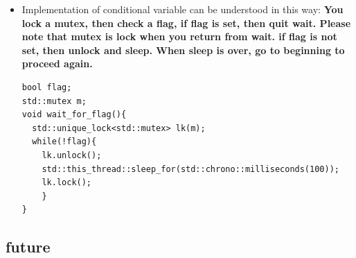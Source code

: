 \documentclass[a4paper,11pt,twoside]{book}
\begin{document}
\begin{itemize}
\begin{lstlisting}[frame=single, language=c++]
void waits(int idx) {
	std::unique_lock<std::mutex> lk(cv_m);
	if(cv.wait_for(lk, idx*100ms, []{return i == 1;})) 
		std::cerr << "Thread " << idx << " finished waiting. i == " << i << '\n';
	else
		std::cerr << "Thread " << idx << " timed out. i == " << i << '\n';
}

void signals() {
	std::this_thread::sleep_for(120ms);
	std::cerr << "Notifying...\n";
	cv.notify_all();
	std::this_thread::sleep_for(100ms); {
		std::lock_guard<std::mutex> lk(cv_m);
		i = 1;
	}
	std::cerr << "Notifying again...\n";
	cv.notify_all();
}

int main() {
	std::thread t1(waits, 1), t2(waits, 2), t3(waits, 3), t4(signals);
	t1.join(); t2.join(); t3.join(); t4.join();
}

\end{lstlisting}

\begin{lstlisting}
Thread 1 timed out. i == 0
Notifying...
Thread 2 timed out. i == 0
Notifying again...
Thread 3 finished waiting. i == 1
\end{lstlisting}

    \item Implementation of conditional variable can be understood in this way: \textbf{You lock a mutex, then check a flag, if flag is set, then quit wait. Please note that mutex is lock when you return from wait.  if flag is not set, then unlock and sleep. When sleep is over, go to beginning to proceed again.} 
\begin{lstlisting}[]
bool flag;
std::mutex m;
void wait_for_flag(){
  std::unique_lock<std::mutex> lk(m);
  while(!flag){
    lk.unlock();
    std::this_thread::sleep_for(std::chrono::milliseconds(100));
    lk.lock();
    }
}
\end{lstlisting}

\end{itemize}

\subsection{future}
\end{document}
